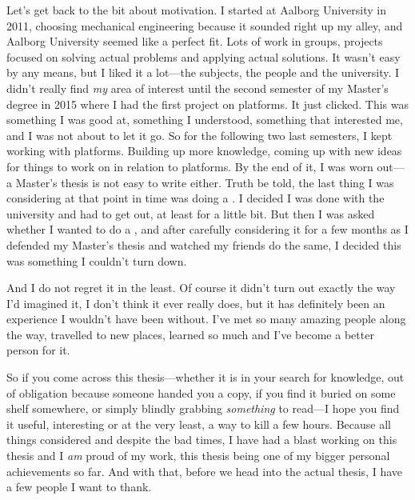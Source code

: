 Let's get back to the bit about motivation.
I started at Aalborg University in 2011, choosing mechanical engineering because it sounded right up my alley, and Aalborg University seemed like a perfect fit.
Lots of work in groups, projects focused on solving actual problems and applying actual solutions.
It wasn't easy by any means, but I liked it a lot---the subjects, the people and the university.
I didn't really find \emph{my} area of interest until the second semester of my Master's degree in 2015 where I had the first project on platforms.
It just clicked.
This was something I was good at, something I understood, something that interested me, and I was not about to let it go.
So for the following two last semesters, I kept working with platforms.
Building up more knowledge, coming up with new ideas for things to work on in relation to platforms.
By the end of it, I was worn out---a Master's thesis is not easy to write either.
Truth be told, the last thing I was considering at that point in time was doing a \PhD{}.
I decided I was done with the university and had to get out, at least for a little bit.
But then I was asked whether I wanted to do a \PhD{}, and after carefully considering it for a few months as I defended my Master's thesis and watched my friends do the same, I decided this was something I couldn't turn down.

And I do not regret it in the least.
Of course it didn't turn out exactly the way I'd imagined it, I don't think it ever really does, but it has definitely been an experience I wouldn't have been without.
I've met so many amazing people along the way, travelled to new places, learned so much and I've become a better person for it. 

So if you come across this thesis---whether it is in your search for knowledge, out of obligation because someone handed you a copy, if you find it buried on some shelf somewhere, or simply blindly grabbing \emph{something} to read---I hope you find it useful, interesting or at the very least, a way to kill a few hours.
Because all things considered and despite the bad times, I have had a blast working on this thesis and I \emph{am} proud of my work, this thesis being one of my bigger personal achievements so far.
And with that, before we head into the actual thesis, I have a few people I want to thank.


